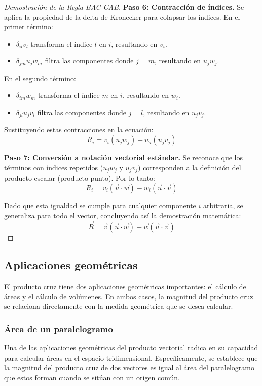 \begin{proof}[Demostración de la Regla BAC-CAB]
\textbf{Paso 6: Contracción de índices.}
Se aplica la propiedad de la delta de Kronecker para colapsar los índices. 
En el primer término:
\begin{itemize}
    \item $\delta_{il} v_l$ transforma el índice $l$ en $i$, resultando en $v_i$.
    \item $\delta_{jm} u_j w_m$ filtra las componentes donde $j = m$, resultando en $u_j w_j$.
\end{itemize}
En el segundo término:
\begin{itemize}
    \item $\delta_{im} w_m$ transforma el índice $m$ en $i$, resultando en $w_i$.
    \item $\delta_{jl} u_j v_l$ filtra las componentes donde $j = l$, resultando en $u_j v_j$.
\end{itemize}

Sustituyendo estas contracciones en la ecuación:
\[ R_i = v_i (u_j w_j) - w_i (u_j v_j) \]

\textbf{Paso 7: Conversión a notación vectorial estándar.}
Se reconoce que los términos con índices repetidos ($u_j w_j$ y $u_j v_j$) corresponden a la definición del producto escalar (producto punto). Por lo tanto:
\[ R_i = v_i (\vec{u} \cdot \vec{w}) - w_i (\vec{u} \cdot \vec{v}) \]

Dado que esta igualdad se cumple para cualquier componente $i$ arbitraria, se generaliza para todo el vector, concluyendo así la demostración matemática:
\[ \vec{R} = \vec{v} (\vec{u} \cdot \vec{w}) - \vec{w} (\vec{u} \cdot \vec{v}) \]
\end{proof}

\subsection{Aplicaciones geométricas}

El producto cruz tiene dos aplicaciones geométricas importantes: el cálculo de áreas y el cálculo de volúmenes. En ambos casos, la magnitud del producto cruz se relaciona directamente con la medida geométrica que se desea calcular.

\subsubsection{Área de un paralelogramo}

Una de las aplicaciones geométricas del producto vectorial radica en su capacidad para calcular áreas en el espacio tridimensional. Específicamente, se establece que la magnitud del producto cruz de dos vectores es igual al área del paralelogramo que estos forman cuando se sitúan con un origen común.

